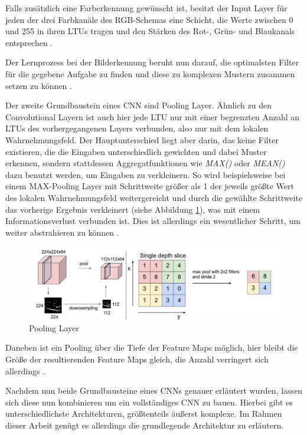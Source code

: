 Falls zusätzlich eine Farberkennung gewünscht ist, besitzt der Input Layer für jeden der drei Farbkanäle des RGB-Schemas eine Schicht, die Werte zwischen 0 und 255 in ihren LTUs tragen und den Stärken des Rot-, Grün- und Blaukanals entsprechen \cite{AurelienGeron.2018}.

Der Lernprozess bei der Bilderkennung beruht nun darauf, die optimalsten Filter für die gegebene Aufgabe zu finden und diese zu komplexen Mustern zusammen setzen zu können  \cite{AurelienGeron.2018}.

Der zweite Grundbaustein eines CNN sind Pooling Layer. Ähnlich zu den Convolutional Layern ist auch hier jede LTU nur mit einer begrenzten Anzahl an LTUs des vorhergegangenen Layers verbunden, also nur mit dem lokalen Wahrnehmungsfeld. Der Hauptunterschied liegt aber darin, das keine Filter existieren, die die Eingaben unterschiedlich gewichten und dabei Muster erkennen, sondern stattdessen Aggregatfunktionen wie \textit{MAX()} oder \textit{MEAN()} dazu benutzt werden, um Eingaben zu verkleinern. So wird beispielsweise bei einem MAX-Pooling Layer mit Schrittweite größer als 1 der jeweils größte Wert des lokalen Wahrnehmungsfeld weitergereicht und durch die gewählte Schrittweite das vorherige Ergebnis verkleinert (siehe Abbildung \ref{pooling_layer}), was mit einem Informationsverlust verbunden ist. Dies ist allerdings ein wesentlicher Schritt, um weiter abstrahieren zu können \cite{AurelienGeron.2018}.

\begin{figure}[ht]
	\begin{center}
		\includegraphics[width=15cm]{Bilder/pooling_layer.png} 
		\caption[Pooling Layer]{Pooling Layer \cite{LeonadroAraujoSantos.2018}}
		\label{pooling_layer}
	\end{center}
\end{figure}

Daneben ist ein Pooling über die Tiefe der Feature Maps möglich, hier bleibt die Größe der resultierenden Feature Maps gleich, die Anzahl verringert sich allerdings \cite{AurelienGeron.2018}.

Nachdem nun beide Grundbausteine eines CNNs genauer erläutert wurden, lassen sich diese nun kombinieren um ein vollständiges CNN zu bauen. Hierbei gibt es unterschiedlichste Architekturen, größtenteils äußerst komplexe. Im Rahmen dieser Arbeit genügt es allerdings die grundlegende Architektur zu erläutern.

